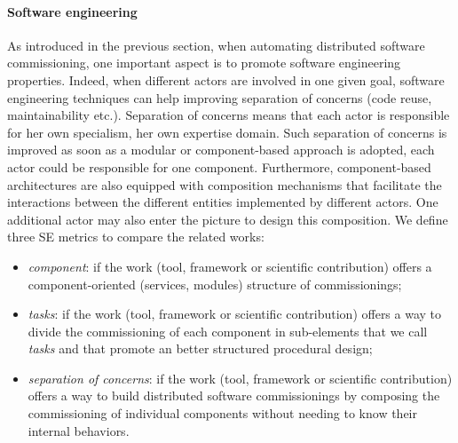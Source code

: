 \paragraph{Software engineering}
As introduced in the previous section, when automating distributed
software commissioning, one important aspect is to promote software
engineering properties. Indeed, when different actors are involved in
one given goal, software engineering techniques can help improving
separation of concerns (\ie code reuse, maintainability
etc.). Separation of concerns means that each actor is responsible for
her own specialism, \ie her own expertise domain. Such separation of
concerns is improved as soon as a modular or component-based approach
is adopted, \ie each actor could be responsible for one
component. Furthermore, component-based architectures are also equipped
with composition mechanisms that facilitate the interactions between the
different entities implemented by different actors. One additional
actor may also enter the picture to design this composition. We define
three SE metrics to compare the related works:
\begin{itemize}
\item \emph{component}: if the work (tool, framework or scientific
  contribution) offers a component-oriented (\eg services, modules)
  structure of commissionings;
\item \emph{tasks}: if the work (tool, framework or scientific
  contribution) offers a way to divide the commissioning of each
  component in sub-elements that we call \emph{tasks} and that promote
  an better structured procedural design;
\item \emph{separation of concerns}: if the work (tool, framework or
  scientific contribution) offers a way to build distributed software
  commissionings by composing the commissioning of individual
  components without needing to know their internal behaviors.
\end{itemize}

